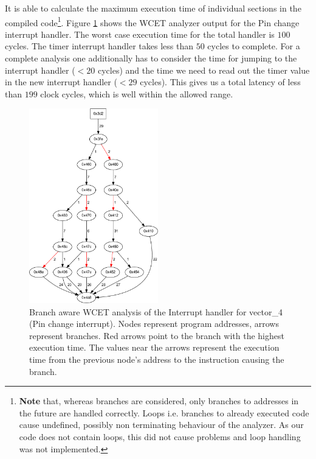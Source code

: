 \documentclass[a4paper]{scrreprt}
\begin{document}
It is able to calculate the maximum execution time of individual sections in the compiled code\footnote{\textbf{Note} that,
whereas branches are considered, only branches to addresses in the future are handled correctly. Loops i.e.
branches to already executed code cause undefined, possibly non terminating behaviour of the analyzer. As our code
does not contain loops, this did not cause problems and loop handling was not implemented.}. Figure \ref{fig:wcet}
shows the WCET analyzer output for the Pin change interrupt handler. The worst case execution time for the total
handler is $100$ cycles. The timer interrupt handler takes less than $50$ cycles to complete. For a complete analysis one
additionally has to consider the time for jumping to the interrupt handler ($<20$ cycles) and the time we need to read out the
timer value in the new interrupt handler ($<29$ cycles). This gives us a total latency of less than $199$ clock
cycles, which is well within the allowed range.
\begin{figure}
	\centering
	\includegraphics[width=0.5\textwidth]{img/wcet/vector_4.pdf}
  \caption{Branch aware WCET analysis of the Interrupt handler for vector\_4 (Pin change interrupt).
  Nodes represent program addresses, arrows represent branches. Red arrows point to the branch with the
highest execution time. The values near the arrows represent the execution time from the previous node's
address to the instruction causing the branch.}
	\label{fig:wcet}
\end{figure}
\end{document}
